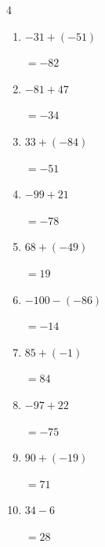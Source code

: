\begin{multicols}{4}
\begin{enumerate}
        $=154$

  \item $-31+(-51)$

        $=-82$

  \item $-81+47$

        $=-34$

  \item $33+(-84)$

        $=-51$

  \item $-99+21$

        $=-78$

  \item $68+(-49)$

        $=19$

  \item $-100-(-86)$

        $=-14$

  \item $85+(-1)$

        $=84$

  \item $-97+22$

        $=-75$

  \item $90+(-19)$

        $=71$

  \item $34-6$

        $=28$

\end{enumerate}
\end{multicols}
